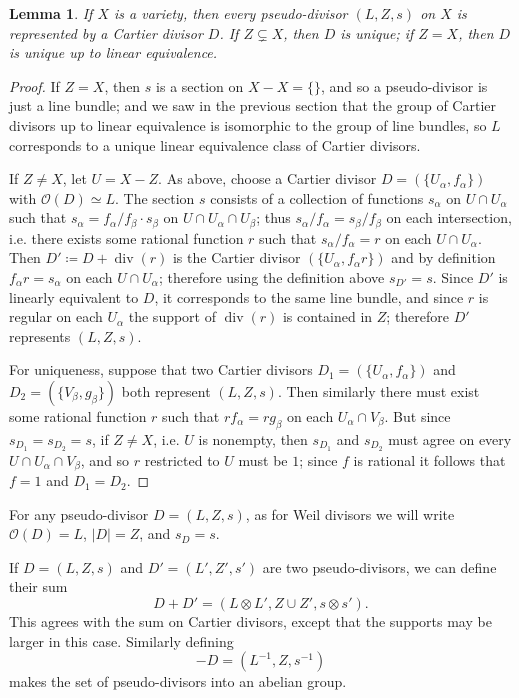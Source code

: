 \documentclass[leqno, openany]{memoir}
\newtheorem{lem}[thm]{Lemma}
\theoremstyle{definition}
\theoremstyle{remark}
\theoremstyle{plain}
\theoremstyle{definition}
\theoremstyle{remark}
\newcommand{\msc}[1]{\mathscr{#1}}
\renewcommand{\div}{\operatorname{div}}
\begin{document}
\begin{lem}
If $X$ is a variety, then every pseudo-divisor $(L,Z,s)$ on $X$ is represented by a Cartier divisor $D$. If $Z \subsetneq X$, then $D$ is unique; if $Z = X$, then $D$ is unique up to linear equivalence.
\end{lem}
\begin{proof}
If $Z = X$, then $s$ is a section on $X - X = \{\}$, and so a pseudo-divisor is just a line bundle; and we saw in the previous section that the group of Cartier divisors up to linear equivalence is isomorphic to the group of line bundles, so $L$ corresponds to a unique linear equivalence class of Cartier divisors.

If $Z \neq X$, let $U = X - Z$. As above, choose a Cartier divisor $D = (\{U_\alpha, f_\alpha\})$ with $\msc{O}(D) \simeq L$. The section $s$ consists of a collection of functions $s_\alpha$ on $U \cap U_\alpha$ such that $s_\alpha = f_\alpha/f_\beta \cdot s_\beta$ on $U \cap U_\alpha \cap U_\beta$; thus $s_\alpha/f_\alpha = s_\beta/f_\beta$ on each intersection, i.e. there exists some rational function $r$ such that $s_\alpha / f_\alpha = r$ on each $U \cap U_\alpha$. Then $D' \coloneqq D + \div(r)$ is the Cartier divisor $(\{U_\alpha, f_\alpha r\})$ and by definition $f_\alpha r = s_\alpha$ on each $U \cap U_\alpha$; therefore using the definition above $s_{D'} = s$. Since $D'$ is linearly equivalent to $D$, it corresponds to the same line bundle, and since $r$ is regular on each $U_\alpha$ the support of $\div(r)$ is contained in $Z$; therefore $D'$ represents $(L,Z,s)$.

For uniqueness, suppose that two Cartier divisors $D_1 = (\{U_\alpha, f_\alpha\})$ and $D_2 = (\{V_\beta, g_\beta\})$ both represent $(L,Z,s)$. Then similarly there must exist some rational function $r$ such that $r f_\alpha = r g_\beta$ on each $U_\alpha \cap V_\beta$. But since $s_{D_1} = s_{D_2} = s$, if $Z \neq X$, i.e. $U$ is nonempty, then $s_{D_1}$ and $s_{D_2}$ must agree on every $U \cap U_\alpha \cap V_\beta$, and so $r$ restricted to $U$ must be $1$; since $f$ is rational it follows that $f = 1$ and $D_1 = D_2$.
\end{proof}

For any pseudo-divisor $D = (L,Z,s)$, as for Weil divisors we will write $\msc{O}(D) = L$, $|D| = Z$, and $s_D = s$.

If $D = (L,Z,s)$ and $D' = (L', Z', s')$ are two pseudo-divisors, we can define their sum \[ D + D' = (L \otimes L', Z \cup Z', s \otimes s') . \] This agrees with the sum on Cartier divisors, except that the supports may be larger in this case. Similarly defining \[ -D = (L^{-1}, Z, s^{-1}) \] makes the set of pseudo-divisors into an abelian group.
\end{document}
